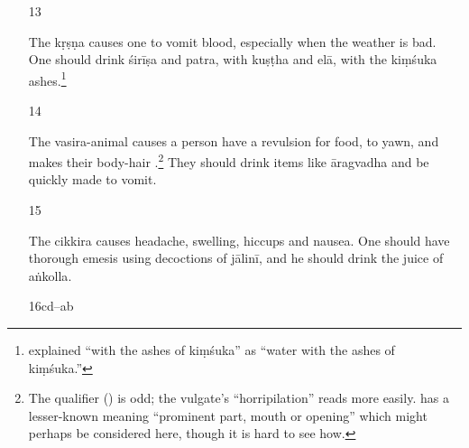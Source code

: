 \begin{translation}
\begin{itemize}
The \Gls{putraka} causes the limbs to droop and creates a pale
,\footnote{The expression  “beauty” in the
    Nepalese MSS, for the vulgate's simpler  “complexion,” is
    unusual.} and the body is heaped with lumps like the young of a
    rat.\footnote{The grammar here is very loose.  cannot
        stand outside the compound, which should read
        .  The vulgate text has the simpler and
        grammatical  “resembling the offspring of a
        rat.”}  One should lick \gls{śirīṣa}, \gls{iṅgudi} and \gls{patra}
        with honey.\footnote{ here cited a passage 
        by
            an unknown author called Nāgārjuna, about the visible symptoms of a
            bite by this kind of rat (cf.\ \cite[45--46]{shar-1982},
            [497, note 100]{meul-hist}) as well as variant readings
            by Gayadāsa and Jejjaṭa on the exact formulation of the lickable
            medication.}

\item [13]

The \Gls{kṛṣṇa} causes one to vomit blood, especially when the
weather is bad.  One should drink \gls{śirīṣa} and \gls{patra},  
with \gls{kuṣṭha} and \gls{elā}, with the 
\gls{kiṃśuka} ashes.\footnote{ explained “with the 
ashes of \gls{kiṃśuka}” as “water with the ashes of \gls{kiṃśuka}.”}

\item [14]

The \Gls{vasira-animal} causes a person have a revulsion for food, to yawn,
and makes their body-hair .\footnote{The qualifier
     () is odd; the vulgate's 
    “horripilation” reads more easily.  has a lesser-known
    meaning “prominent part, mouth or opening” which might perhaps be
    considered here, though it is hard to see how.}  They should drink
    items like \gls{āragvadha} and be quickly made to vomit.

\item[15]

The \Gls{cikkira} causes headache, swelling, hiccups and nausea.  One
should have thorough emesis using
decoctions of \gls{jālinī}, and he should drink
the juice of \gls{aṅkolla}.

\item[16cd--ab]


\end{itemize}
\end{translation}
